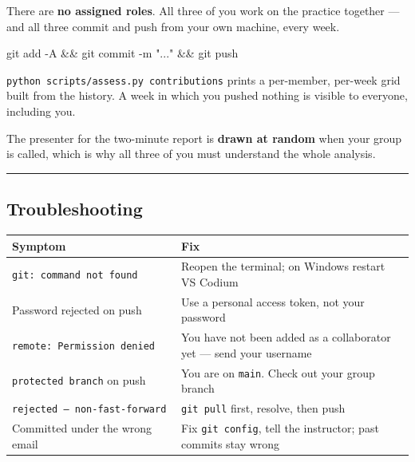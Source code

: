 \documentclass[
  letterpaper,
  10pt,
  twoside,
  openright,
  numbers=noenddot,
  chapterprefix=true]{scrbook}
\newenvironment{Shaded}{}{}
\newcommand{\AttributeTok}[1]{\textcolor[rgb]{0.84,0.23,0.29}{#1}}
\newcommand{\FunctionTok}[1]{\textcolor[rgb]{0.44,0.26,0.76}{#1}}
\newcommand{\KeywordTok}[1]{\textcolor[rgb]{0.84,0.23,0.29}{#1}}
\newcommand{\NormalTok}[1]{\textcolor[rgb]{0.14,0.16,0.18}{#1}}
\newcommand{\StringTok}[1]{\textcolor[rgb]{0.01,0.18,0.38}{#1}}
\begin{document}
There are \textbf{no assigned roles}. All three of you work on the
practice together --- and all three commit and push from your own
machine, every week.

\begin{Shaded}
\begin{Highlighting}[]
\FunctionTok{git}\NormalTok{ add }\AttributeTok{{-}A} \KeywordTok{\&\&} \FunctionTok{git}\NormalTok{ commit }\AttributeTok{{-}m} \StringTok{"..."} \KeywordTok{\&\&} \FunctionTok{git}\NormalTok{ push}
\end{Highlighting}
\end{Shaded}

\texttt{python\ scripts/assess.py\ contributions} prints a per-member,
per-week grid built from the history. A week in which you pushed nothing
is visible to everyone, including you.

The presenter for the two-minute report is \textbf{drawn at random} when
your group is called, which is why all three of you must understand the
whole analysis.

\begin{center}\rule{0.5\linewidth}{0.5pt}\end{center}

\subsection{Troubleshooting}\label{troubleshooting-1}

\begin{longtable}[]{@{}
  >{\raggedright\arraybackslash}p{}
  >{\raggedright\arraybackslash}p{}@{}}
\toprule\noalign{}
\begin{minipage}[b]{\linewidth}\raggedright
Symptom
\end{minipage} & \begin{minipage}[b]{\linewidth}\raggedright
Fix
\end{minipage} \\
\midrule\noalign{}
\endhead
\bottomrule\noalign{}
\endlastfoot
\texttt{git:\ command\ not\ found} & Reopen the terminal; on Windows
restart VS Codium \\
Password rejected on push & Use a personal access token, not your
password \\
\texttt{remote:\ Permission\ denied} & You have not been added as a
collaborator yet --- send your username \\
\texttt{protected\ branch} on push & You are on \texttt{main}. Check out
your group branch \\
\texttt{rejected\ —\ non-fast-forward} & \texttt{git\ pull} first,
resolve, then push \\
Committed under the wrong email & Fix \texttt{git\ config}, tell the
instructor; past commits stay wrong \\
\end{longtable}
\end{document}
